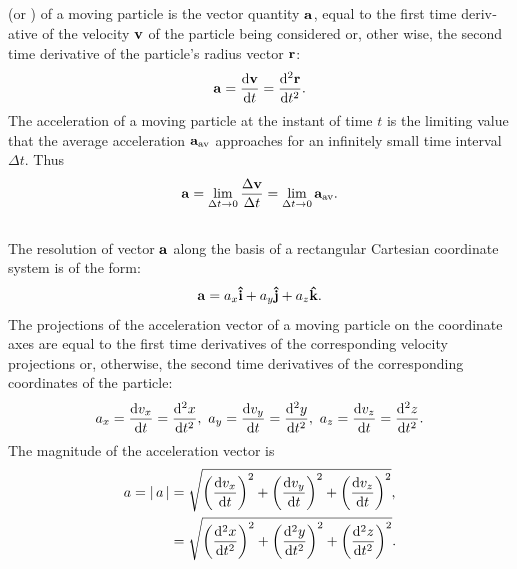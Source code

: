 \subsection{}\label{1.4.2}  (or ) of a moving particle is the vector quantity $\vb{a}$, equal to the first time deriv­ative of the velocity $\vb{v}$ of the particle being considered or, other­ wise, the second time derivative of the particle's radius vector $\vb{r}$:
\begin{equation*}%
\vb{a} = \dv{\vb{v}}{t} = \dv[2]{\vb{r}}{t}.
\end{equation*}
The acceleration of a moving particle at the instant of time $t$ is the limiting value that the average acceleration $\vb{a_{\textrm{av}}}$ approaches for an infinitely small time interval $\Delta t$. Thus
\begin{equation*}%
\vb{a} = \lim_{\Delta t \to 0}\frac{\Delta \vb{v}}{\Delta t} = \lim_{\Delta t \to 0} \vb{a_{\textrm{av}}}.
\end{equation*}

\subsection{}\label{1.4.3} The resolution of vector $\vb{a}$ along the basis of a rectangular Cartesian coordinate system is of the form:
\begin{equation*}%
\vb{a} = a_{x} \vu{i} + a_{y} \vu{j} + a_{z} \vu{k}.
\end{equation*}
The projections of the acceleration vector of a moving particle on the coordinate axes are equal to the first time derivatives of the corresponding velocity projections or, otherwise, the second time derivatives of the corresponding coordinates of the par­ticle:
\begin{equation*}%
a_{x} = \dv{v_{x}}{t} = \dv[2]{x}{t}, \,\,a_{y} = \dv{v_{y}}{t} = \dv[2]{y}{t}, \,\,a_{z} = \dv{v_{z}}{t} = \dv[2]{z}{t}.
\end{equation*}
The magnitude of the acceleration vector is
\begin{align*}%
a = \abs{\,a\,} & = \sqrt{\left( \dv{v_{x}}{t}\right)^{2}+\left( \dv{v_{y}}{t}\right)^{2}
+\left( \dv{v_{z}}{t}\right)^{2}}, \\
& = \sqrt{\left( \dv[2]{x}{t}\right)^{2}+\left( \dv[2]{y}{t}\right)^{2}
+\left( \dv[2]{z}{t}\right)^{2}} .
\end{align*}


